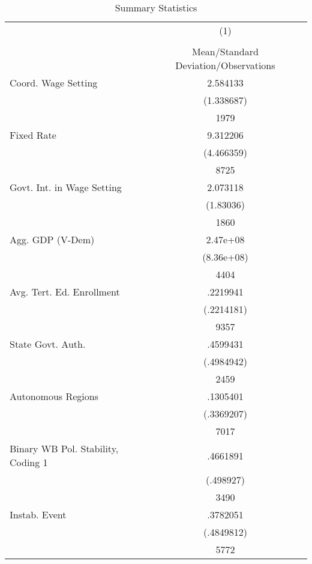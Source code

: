 {
\def\sym#1{\ifmmode^{#1}\else\(^{#1}\)\fi}
\begin{longtable}{l*{1}{c}}
\caption{Summary Statistics \label{sumstatsAll}}\\
\hline\hline\endfirsthead\hline\endhead\hline\endfoot\endlastfoot
                    &\multicolumn{1}{c}{(1)}\\
                    &\multicolumn{1}{c}{}\\
                    &Mean/Standard Deviation/Observations\\
\hline
Coord. Wage Setting &    2.584133\\
                    &  (1.338687)\\
                    &        1979\\
Fixed Rate          &    9.312206\\
                    &  (4.466359)\\
                    &        8725\\
Govt. Int. in Wage Setting&    2.073118\\
                    &   (1.83036)\\
                    &        1860\\
Agg. GDP (V-Dem)    &    2.47e+08\\
                    &  (8.36e+08)\\
                    &        4404\\
Avg. Tert. Ed. Enrollment&    .2219941\\
                    &  (.2214181)\\
                    &        9357\\
State Govt. Auth.   &    .4599431\\
                    &  (.4984942)\\
                    &        2459\\
Autonomous Regions  &    .1305401\\
                    &  (.3369207)\\
                    &        7017\\
Binary WB Pol. Stability, Coding 1&    .4661891\\
                    &   (.498927)\\
                    &        3490\\
Instab. Event       &    .3782051\\
                    &  (.4849812)\\
                    &        5772\\

\end{longtable}}

